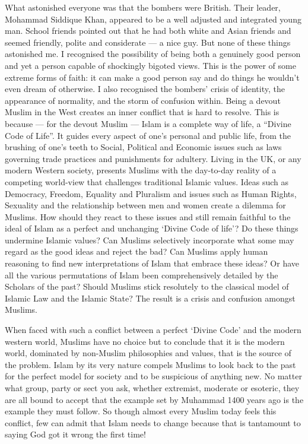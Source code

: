 \documentclass[12pt]{memoir}
\newcommand{\cor}[2]{#2} %
\begin{document}
What astonished everyone was that the bombers were British.
Their leader, Mohammad Siddique Khan,
appeared to be a well adjusted and integrated young man.
School friends pointed out that he had both white and Asian friends
and seemed friendly, polite and considerate — a nice guy.
But none of these things astonished me.
I recognised the possibility of being both a genuinely good person
and yet a person capable of shockingly bigoted views.
This is the power of some extreme forms of faith:
it can make a good person say and do things
he wouldn’t even dream of otherwise.
I also recognised the bombers’ crisis of identity,
the appearance of normality, and the storm of confusion within.
Being a devout Muslim in the West creates an inner conflict
that is hard to resolve.
This is because — for the devout Muslim —
Islam is a complete way of life, a “Divine Code of Life”.
It guides every aspect of one’s personal and public life,
from the brushing of one’s teeth to Social, Political and Economic issues
such as laws governing trade \cor{practises}{practices}
and punishments for adultery.
Living in the UK, or any modern Western society, presents Muslims with
the day-to-day reality of a competing world-view
that challenges traditional Islamic values.
Ideas such as Democracy, Freedom, Equality and Pluralism
and issues such as Human Rights, Sexuality and the relationship
between men and women create a dilemma for Muslims.
How should they react to these issues and still remain faithful
to the ideal of Islam as a perfect and unchanging ‘Divine Code of life’?
Do these things undermine Islamic values?
Can Muslims selectively incorporate what some may regard
as the good ideas and reject the bad?
Can Muslims apply human reasoning to find new interpretations of Islam
that embrace these ideas?
Or have all the various permutations of Islam
been comprehensively detailed by the Scholars of the past?
Should Muslims stick resolutely to the classical model
of Islamic Law and the Islamic State?
The result is a crisis and confusion amongst Muslims.

When faced with such a conflict between a perfect ‘Divine Code’
and the modern western world, Muslims have no choice
but to conclude that it is the modern world,
dominated by non-Muslim philosophies and values,
that is the source of the problem.
Islam by its very nature compels Muslims to look back to the past
for the perfect model for society and to be suspicious of anything new.
No matter what group, party or sect you ask, whether extremist,
moderate or esoteric, they are all bound to accept that the example
set by Muhammad 1400 years ago is the example they must follow.
So though almost every Muslim today feels this conflict,
few can admit that Islam needs to change because
that is tantamount to saying God got it wrong the first time!
\end{document}
